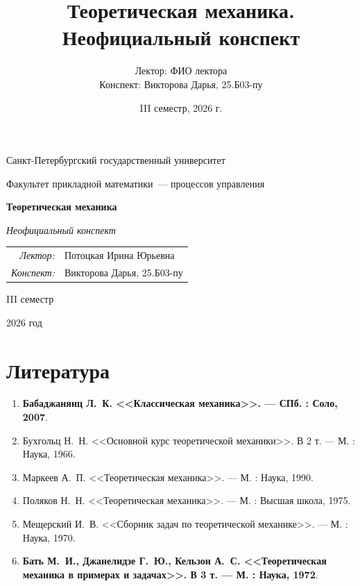 \documentclass[12pt,a4paper]{report}
\title{Теоретическая механика. Неофициальный конспект}
\author{Лектор: ФИО лектора\\
Конспект: Викторова Дарья, 25.Б03-пу}
\date{III семестр, 2026 г.}
\begin{document}
\begin{titlepage}
    \thispagestyle{empty}
    \begin{center}
        \vspace*{0.6cm}

        {\large Санкт-Петербургский государственный университет\par}
        \vspace{0.35em}
        {\normalsize Факультет прикладной математики~--- процессов управления\par}

        \vspace*{5.1cm}

        {\fontsize{30}{35}\selectfont\bfseries Теоретическая механика\par}
        \vspace{0.65em}
        {\fontsize{17}{21}\selectfont\itshape Неофициальный конспект\par}

        \vspace{2.7cm}

        {\normalsize
        \begin{tabular}{@{}rl@{}}
            \textit{Лектор:} & Потоцкая Ирина Юрьевна \\
            \textit{Конспект:} & Викторова Дарья, 25.Б03-пу
        \end{tabular}\par}

        \vfill

        {\large III семестр\par}
        \vspace{0.22em}
        {\large 2026 год\par}
        \vspace*{0.55cm}
    \end{center}
\end{titlepage}

\tableofcontents
\newpage

\setcounter{lection}{0}


\section*{Литература}
\begin{enumerate}
    \item \textbf{Бабаджанянц Л.\ К. <<Классическая механика>>. --- СПб. : Соло, 2007}.
    \item Бухгольц Н.\ Н. <<Основной курс теоретической механики>>. В 2 т. --- М. : Наука, 1966.
    \item Маркеев А.\ П. <<Теоретическая механика>>. --- М. : Наука, 1990.
    \item Поляков Н.\ Н. <<Теоретическая механика>>. --- М. : Высшая школа, 1975.
    \item Мещерский И.\ В. <<Сборник задач по теоретической механике>>. --- М. : Наука, 1970.
    \item \textbf{Бать М.\ И., Джанелидзе Г.\ Ю., Кельзон А.\ С. <<Теоретическая механика в примерах и задачах>>. В 3 т. --- М. : Наука, 1972}.
\end{enumerate}
\end{document}

